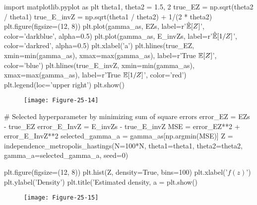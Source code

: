 \begin{python}
import matplotlib.pyplot as plt
theta1, theta2 = 1.5, 2
true_EZ = np.sqrt(theta2 / theta1)
true_E_invZ = np.sqrt(theta1 / theta2) + 1/(2 * theta2)
plt.figure(figsize=(12, 8))
plt.plot(gamma_as, EZs, label=r'$\hat{\operatorname{\mathbb{E}}}[Z]$', 
    color='darkblue', alpha=0.5)
plt.plot(gamma_as, E_invZs, label=r'$\hat{\operatorname{\mathbb{E}}}[1 / Z]$', 
    color='darkred', alpha=0.5)
plt.xlabel('a')
plt.hlines(true_EZ, xmin=min(gamma_as), xmax=max(gamma_as), label=r'True $\operatorname{\mathbb{E}}[Z]$', 
    color='blue')
plt.hlines(true_E_invZ, xmin=min(gamma_as), xmax=max(gamma_as), label=r'True $\operatorname{\mathbb{E}}[1 / Z]$', 
    color='red')
plt.legend(loc='upper right')
plt.show()
\end{python}

\begin{figure}[H]
\centering
\texttt{[image: Figure-25-14]}
\end{figure}

\begin{python}
# Selected hyperparameter by minimizing sum of square errors
error_EZ = EZs - true_EZ
error_E_InvZ = E_invZs - true_E_invZ
MSE = error_EZ**2 + error_E_InvZ**2
selected_gamma_a = gamma_as[np.argmin(MSE)]
Z = independence_metropolis_hastings(N=100*N, theta1=theta1, theta2=theta2, 
    gamma_a=selected_gamma_a, seed=0)
\end{python}

\begin{python}
plt.figure(figsize=(12, 8))
plt.hist(Z, density=True, bins=100)
plt.xlabel('$f(z)$')
plt.ylabel('Density')
plt.title('Estimated density, a = %
plt.show()
\end{python}

\begin{figure}[H]
\centering
\texttt{[image: Figure-25-15]}
\end{figure}

